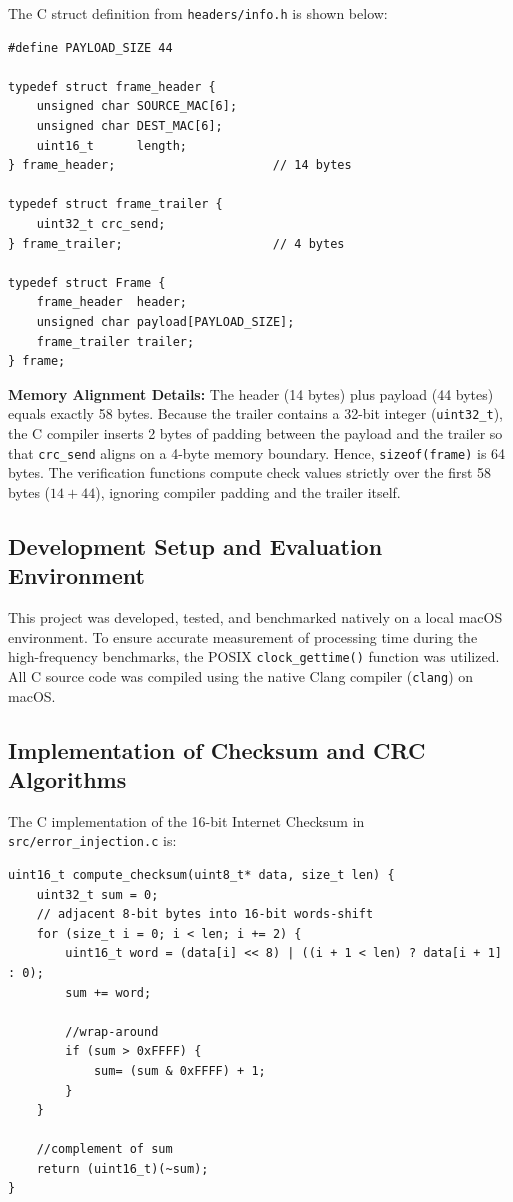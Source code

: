 \documentclass[12pt,a4paper]{article}
\begin{document}
\noindent\begin{minipage}{\linewidth}
The C struct definition from \texttt{headers/info.h} is shown below:
\begin{lstlisting}[caption={Frame Definition (\texttt{info.h})}]
#define PAYLOAD_SIZE 44

typedef struct frame_header {
    unsigned char SOURCE_MAC[6];
    unsigned char DEST_MAC[6];
    uint16_t      length;
} frame_header;                      // 14 bytes

typedef struct frame_trailer {
    uint32_t crc_send;
} frame_trailer;                     // 4 bytes

typedef struct Frame {
    frame_header  header;
    unsigned char payload[PAYLOAD_SIZE];
    frame_trailer trailer;
} frame;
\end{lstlisting}
\end{minipage}

\noindent\textbf{Memory Alignment Details:} The header (14 bytes) plus payload (44 bytes) equals exactly 58 bytes. Because the trailer contains a 32-bit integer (\texttt{uint32\_t}), the C compiler inserts 2 bytes of padding between the payload and the trailer so that \texttt{crc\_send} aligns on a 4-byte memory boundary. Hence, \texttt{sizeof(frame)} is 64 bytes. The verification functions compute check values strictly over the first 58 bytes ($14 + 44$), ignoring compiler padding and the trailer itself.

\subsection{Development Setup and Evaluation Environment}
This project was developed, tested, and benchmarked natively on a local macOS environment. To ensure accurate measurement of processing time during the high-frequency benchmarks, the POSIX \texttt{clock\_gettime()} function was utilized. All C source code was compiled using the native Clang compiler (\texttt{clang}) on macOS.


\subsection{Implementation of Checksum and CRC Algorithms}
\noindent\begin{minipage}{\linewidth}
The C implementation of the 16-bit Internet Checksum in \texttt{src/error\_injection.c} is:

\begin{lstlisting}[caption={Checksum Calculation (\texttt{error\_injection.c})}]
uint16_t compute_checksum(uint8_t* data, size_t len) {
    uint32_t sum = 0;
    // adjacent 8-bit bytes into 16-bit words-shift
    for (size_t i = 0; i < len; i += 2) {
        uint16_t word = (data[i] << 8) | ((i + 1 < len) ? data[i + 1] : 0);
        sum += word;

        //wrap-around
        if (sum > 0xFFFF) {
            sum= (sum & 0xFFFF) + 1;
        }
    }

    //complement of sum
    return (uint16_t)(~sum);
}
\end{lstlisting}
\end{minipage}
\end{document}
